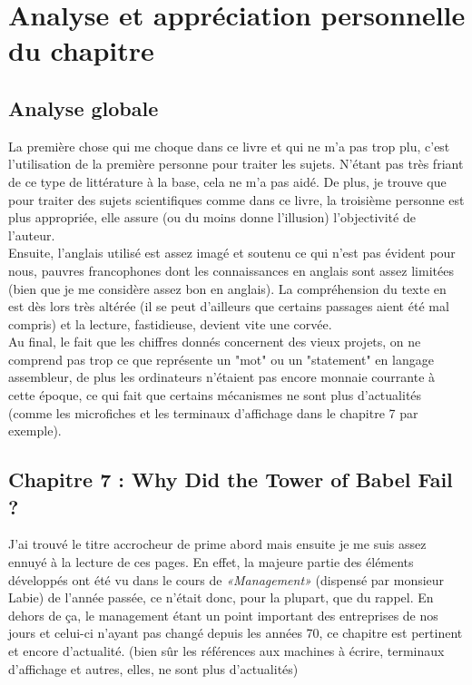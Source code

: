 \documentclass[runningheads]{llncs}
\begin{document}
\newpage
\section{Analyse et appr\'eciation personnelle du chapitre}\label{sec:analyse}

\subsection{Analyse globale}

La première chose qui me choque dans ce livre et qui ne m'a pas trop plu, c'est l'utilisation de la première personne pour 
traiter les sujets. N'étant pas très friant de ce type de littérature à la base, cela ne m'a pas aidé. De plus, je trouve que pour
traiter des sujets scientifiques comme dans ce livre, la troisième personne est plus appropriée, elle assure (ou du moins donne 
l'illusion) l'objectivité de l'auteur. \\

Ensuite, l'anglais utilisé est assez imagé et soutenu ce qui n'est pas évident pour nous, pauvres francophones dont les 
connaissances en anglais sont assez limitées (bien que je me considère assez bon en anglais). La compréhension du texte en est dès 
lors très altérée (il se peut d'ailleurs que certains passages aient été mal compris) et la lecture, fastidieuse, devient vite une 
corvée. \\

Au final, le fait que les chiffres donnés concernent des vieux projets, on ne comprend pas trop ce que représente un "mot" ou un
"statement" en langage assembleur, de plus les ordinateurs n'étaient pas encore monnaie courrante à cette époque, ce qui fait que
certains mécanismes ne sont plus d'actualités (comme les microfiches et les terminaux d'affichage dans le chapitre 7 par exemple).

\subsection{Chapitre 7 : Why Did the Tower of Babel Fail ?}

J'ai trouvé le titre accrocheur de prime abord mais ensuite je me suis assez ennuyé à la lecture de ces pages. En effet, la 
majeure partie des éléments développés ont été vu dans le cours de \textit{«Management»} (dispensé par monsieur Labie) de l'année 
passée, ce n'était donc, pour la plupart, que du rappel. En dehors de ça, le management étant un point important des entreprises 
de nos jours et celui-ci n'ayant pas changé depuis les années 70, ce chapitre est pertinent et encore d'actualité. (bien sûr les 
références aux machines à écrire, terminaux d'affichage et autres, elles, ne sont plus d'actualités) \\
\end{document}
